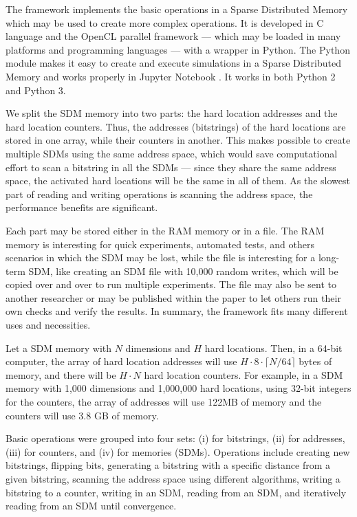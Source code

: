 
The framework implements the basic operations in a Sparse Distributed Memory which may be used to create more complex operations. It is developed in C language and the OpenCL parallel framework --- which may be loaded in many platforms and programming languages --- with a wrapper in Python. The Python module makes it easy to create and execute simulations in a Sparse Distributed Memory and works properly in Jupyter Notebook \citep{kluyver2016jupyter}. It works in both Python 2 and Python 3.

We split the SDM memory into two parts: the hard location addresses and the hard location counters. Thus, the addresses (bitstrings) of the hard locations are stored in one array, while their counters in another. This makes possible to create multiple SDMs using the same address space, which would save computational effort to scan a bitstring in all the SDMs --- since they share the same address space, the activated hard locations will be the same in all of them. As the slowest part of reading and writing operations is scanning the address space, the performance benefits are significant.

Each part may be stored either in the RAM memory or in a file. The RAM memory is interesting for quick experiments, automated tests, and others scenarios in which the SDM may be lost, while the file is interesting for a long-term SDM, like creating an SDM file with 10,000 random writes, which will be copied over and over to run multiple experiments. The file may also be sent to another researcher or may be published within the paper to let others run their own checks and verify the results. In summary, the framework fits many different uses and necessities.

Let a SDM memory with $N$ dimensions and $H$ hard locations. Then, in a 64-bit computer, the array of hard location addresses will use $H \cdot 8 \cdot \lceil N/64 \rceil$ bytes of memory, and there will be $H \cdot N$ hard location counters. For example, in a SDM memory with 1,000 dimensions and 1,000,000 hard locations, using 32-bit integers for the counters, the array of addresses will use 122MB of memory and the counters will use 3.8 GB of memory.

Basic operations were grouped into four sets: (i) for bitstrings, (ii) for addresses, (iii) for counters, and (iv) for memories (SDMs). Operations include creating new bitstrings, flipping bits, generating a bitstring with a specific distance from a given bitstring, scanning the address space using different algorithms, writing a bitstring to a counter, writing in an SDM, reading from an SDM, and iteratively reading from an SDM until convergence.


